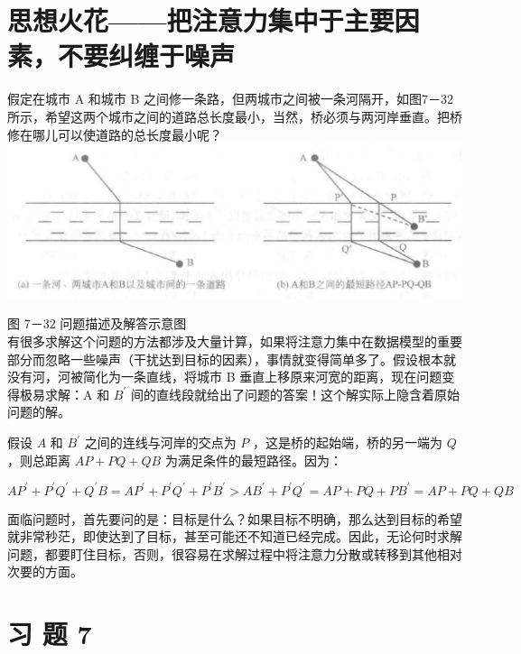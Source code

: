 \documentclass[10pt]{article}
\begin{document}
\section*{思想火花——把注意力集中于主要因素，不要纠缠于噪声}
假定在城市 A 和城市 B 之间修一条路，但两城市之间被一条河隔开，如图7－32所示，希望这两个城市之间的道路总长度最小，当然，桥必须与两河岸垂直。把桥修在哪儿可以使道路的总长度最小呢？\\
\includegraphics[max width=\textwidth, center]{2025_06_06_704745ea57b15b2333e5g-264}

图 7－32 问题描述及解答示意图\\
有很多求解这个问题的方法都涉及大量计算，如果将注意力集中在数据模型的重要部分而忽略一些噪声（干扰达到目标的因素），事情就变得简单多了。假设根本就没有河，河被简化为一条直线，将城市 B 垂直上移原来河宽的距离，现在问题变得极易求解：A 和 $B^{\prime}$ 间的直线段就给出了问题的答案！这个解实际上隐含着原始问题的解。

假设 $A$ 和 $B^{\prime}$ 之间的连线与河岸的交点为 $P$ ，这是桥的起始端，桥的另一端为 $Q$ ，则总距离 $A P+P Q+Q B$ 为满足条件的最短路径。因为：

$$
A P^{\prime}+P^{\prime} Q^{\prime}+Q^{\prime} B=A P^{\prime}+P^{\prime} Q^{\prime}+P^{\prime} B^{\prime}>A B^{\prime}+P^{\prime} Q^{\prime}=A P+P Q+P B^{\prime}=A P+P Q+Q B
$$

面临问题时，首先要问的是：目标是什么？如果目标不明确，那么达到目标的希望就非常秒茫，即使达到了目标，甚至可能还不知道已经完成。因此，无论何时求解问题，都要盯住目标，否则，很容易在求解过程中将注意力分散或转移到其他相对次要的方面。

\section*{习 题 7}
\end{document}
